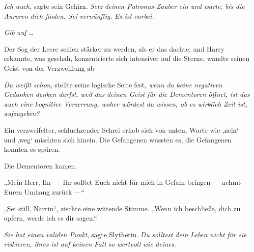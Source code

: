 \emph{Ich auch}, sagte sein Gehirn. \emph{Setz deinen Patronus-Zauber ein und warte, bis die Auroren dich finden. Sei vernünftig. Es ist vorbei.}

\emph{Gib auf …}

Der Sog der Leere schien stärker zu werden, als er das dachte; und Harry erkannte, was geschah, konzentrierte sich intensiver auf die Sterne, wandte seinen Geist von der Verzweiflung ab —

\emph{Du weißt schon}, stellte seine logische Seite fest, \emph{wenn du keine negativen Gedanken denken darfst, weil das deinen Geist für die Dementoren öffnet, ist das auch eine kognitive Verzerrung, woher würdest du wissen, ob es wirklich Zeit \emph{ist}, aufzugeben?}

Ein verzweifelter, schluchzender Schrei erhob sich von unten, Worte wie ‚nein‘ und ‚weg‘ mischten sich hinein. Die Gefangenen wussten es, die Gefangenen konnten es spüren.

Die Dementoren kamen.

„Mein Herr, Ihr — Ihr solltet Euch nicht für mich in Gefahr bringen — nehmt Euren Umhang zurück —“

„Sei still, Närrin“, zischte eine wütende Stimme.
„Wenn ich beschließe, dich zu opfern, werde ich es dir sagen.“

\emph{Sie hat einen validen Punkt}, sagte Slytherin. \emph{Du solltest dein Leben nicht für sie riskieren, ihres ist auf keinen Fall so wertvoll wie deines.}

